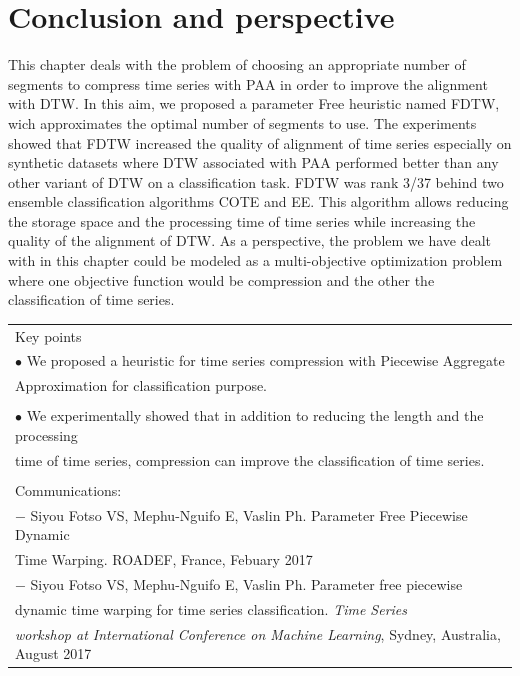 \section{Conclusion and perspective}
\label{sec:5}
This chapter deals with the problem of choosing an appropriate number of segments to compress time series with PAA in order to improve the alignment with DTW. In this aim, we proposed a parameter Free heuristic named FDTW, wich approximates the optimal number of segments to use. The experiments showed that FDTW increased the quality of alignment of time series especially on synthetic datasets where DTW associated with PAA performed better than any other variant of DTW on a classification task. FDTW was rank 3/37 behind two ensemble classification algorithms COTE and EE. This algorithm allows reducing the storage space and the processing time of time series while increasing the quality of the alignment of DTW. As a perspective, the problem we have dealt with in this chapter could be modeled as a multi-objective optimization problem where one objective function would be compression and the other the classification of time series. 




\begin{table}[ht]
\centering
\begin{tabular}{|l|}

\hline
\rowcolor{LavenderBlush}
Key points\\
$\bullet$ We proposed a heuristic for time series compression with Piecewise Aggregate\\ Approximation for classification purpose. \\
\\
$\bullet$ We experimentally showed that in addition to reducing the length and the processing\\ time of time series, compression can improve the classification of time series.\\ 
\\
Communications:\\
$-$ Siyou Fotso VS, Mephu-Nguifo E, Vaslin Ph. Parameter Free Piecewise Dynamic\\ Time Warping. ROADEF, France, Febuary 2017\\
$-$  Siyou Fotso VS, Mephu-Nguifo E, Vaslin Ph. Parameter free piecewise\\ dynamic time warping for time series classification. \textit{Time Series} \\ \textit{workshop at International Conference on Machine Learning}, Sydney, Australia, August 2017\\
\hline
\end{tabular}
\end{table}